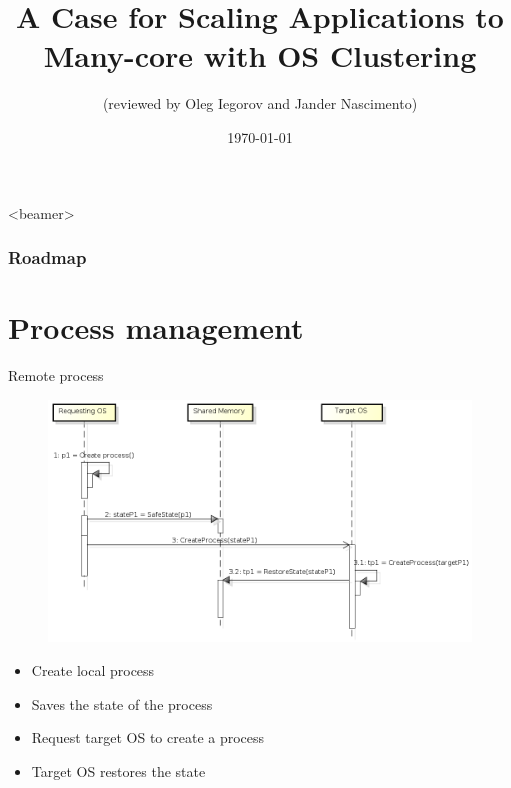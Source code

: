 \documentclass{beamer}
\title[A Case for Scaling Applications to Many-core with OS Clustering ]{A Case for Scaling Applications to Many-core with OS Clustering}
\author{
(reviewed by Oleg Iegorov and Jander Nascimento)}
\institute{University Joseph Fourier}
\date{\today}
\begin{document}
\begin{frame}
\titlepage
\end{frame}

{
  \begin{frame}<beamer>
    \frametitle{Roadmap}
    \tableofcontents%
  \end{frame}
}


\section{Process management}

	\begin{frame}{Remote process}

	\begin{figure} [H]
			\centering
			\includegraphics[scale=0.3]{img/cerberus-process-creation}
	\end{figure}

	\begin{itemize}
	\item Create local process
	\item Saves the state of the process
	\item Request target OS to create a process
	\item Target OS restores the state
	\end{itemize}
	
	\end{frame}	
\end{document}
